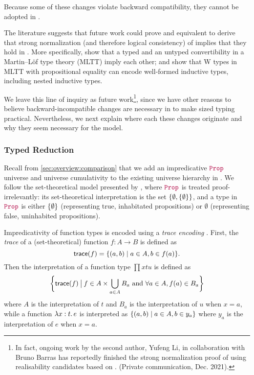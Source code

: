 Because some of these changes violate backward compatibility, they cannot be
adopted in \lang.

The literature suggests that future work could prove \langAnother and \lang
equivalent to derive that strong normalization (and therefore logical
consistency) of \langAnother implies that they hold in \lang.
More specifically, \cite{conversion} show that a typed and an untyped convertibility in a Martin--L\"of type theory (MLTT) imply each other;
and \citet{whynotW, polynomial-functors-w} show that W types in MLTT with propositional equality
can encode well-formed inductive types, including nested inductive types.

We leave this line of inquiry as future work\footnote{In fact, ongoing work by
  the second author, Yufeng Li, in collaboration with Bruno Barras has reportedly
  finished the strong normalization proof of \langAnother using realisability
  candidates based on \citet{barras-thesis}. (Private
  communication, Dec. 2021).}, since we have other reasons to believe backward-incompatible
  changes are necessary in \lang to make sized typing practical.
Nevertheless, we next explain where each these changes originate and why they
seem necessary for the model.

\subsubsection{Typed Reduction}

Recall from \autoref{sec:overview:comparison} that we add an impredicative $\Prop$ universe
and universe cumulativity to the existing universe hierarchy in \CIChatminus.
We follow the set-theoretical model presented by \citet{not-so-simple-cc},
where $\Prop$ is treated proof-irrelevantly:
its set-theoretical interpretation is the set $\{\emptyset, \{\emptyset\}\}$,
and a type in $\Prop$ is either $\{\emptyset\}$ (representing true, inhabitated propositions)
or $\emptyset$ (representing false, uninhabited propositions).

Impredicativity of function types is encoded using a \emph{trace encoding} \citep{aczel-trace}.
First, the \emph{trace} of a (set-theoretical) function $f : A \to B$ is defined as
$$\textsf{trace}(f) = \{(a, b) \mid a \in A, b \in f(a)\}.$$
Then the interpretation of a function type $\prod{x}{t}{u}$ is defined as
$$\bigg\{\textsf{trace}(f) \mathbin{\big|} f \in A \times \bigcup_{a \in A} B_a \text{ and } \forall a \in A, f(a) \in B_a\bigg\}$$
where $A$ is the interpretation of $t$ and $B_a$ is the interpretation of $u$ when $x = a$,
while a function $\lambda x : t \mathpunct{.} e$ is interpreted as
$\{(a, b) \mid a \in A, b \in y_a\}$
where $y_a$ is the interpretation of $e$ when $x = a$.

